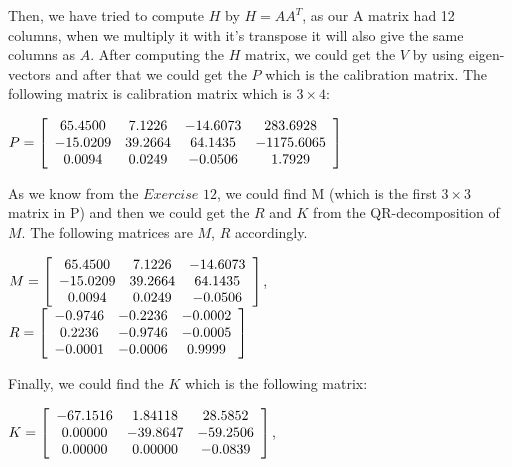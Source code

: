 \documentclass[]{article}
\begin{document}
Then, we have tried to compute $H$ by $H=AA^T$, as our A matrix had 12 columns, when we multiply it with it's transpose it will also give the same columns as $A$. After computing the $H$ matrix, we could get the $V$ by using eigen-vectors and after that we could get the $P$ which is the calibration matrix. The following matrix is calibration matrix which is $3 \times 4$:

\vspace{0.5em}

\centerline {
	$ P =\left[ {\begin{array}{*{20}c}
		65.4500 & 7.1226 & -14.6073 & 283.6928 \\
		-15.0209 & 39.2664 & 64.1435 & -1175.6065 \\
		0.0094 & 0.0249 & -0.0506 & 1.7929   
		\end{array} } \right] $
}

\vspace{0.5em}

As we know from the $Exercise$ $12$, we could find M (which is the first $3 \times 3$ matrix in P) and then we could get the $R$ and $K$ from the QR-decomposition of $M$. The following matrices are $M$, $R$ accordingly. 

\vspace{0.5em}

 \centerline {
 	$ M =\left[ {\begin{array}{*{20}c}
 		65.4500 & 7.1226 & -14.6073  \\
 		-15.0209 & 39.2664 & 64.1435  \\
 		 0.0094 & 0.0249 & -0.0506    
 		\end{array} } \right] $, $ R =\left[ {\begin{array}{*{20}c}
 		-0.9746 & -0.2236 & -0.0002  \\
 		0.2236 & -0.9746 & -0.0005  \\
 		-0.0001 & -0.0006 & 0.9999    
 		\end{array} } \right] $
 }

\vspace{0.5em}

Finally, we could find the $K$ which is the following matrix: 

\vspace{0.5em}

\centerline {
	$ K =\left[ {\begin{array}{*{20}c}
		-67.1516 & 1.84118 & 28.5852  \\
		0.00000 & -39.8647 & -59.2506  \\
		0.00000 & 0.00000 & -0.0839    
		\end{array} } \right] $,
}
\end{document}
